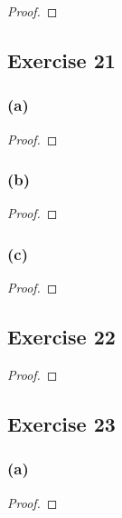 \documentclass[14pt]{extarticle}
\begin{document}
\begin{proof}

\end{proof}

\subsection{Exercise 21}

\subsubsection{(a)}

\begin{proof}

\end{proof}

\subsubsection{(b)}

\begin{proof}

\end{proof}

\subsubsection{(c)}

\begin{proof}

\end{proof}

\subsection{Exercise 22}

\begin{proof}

\end{proof}

\subsection{Exercise 23}

\subsubsection{(a)}

\begin{proof}

\end{proof}
\end{document}
